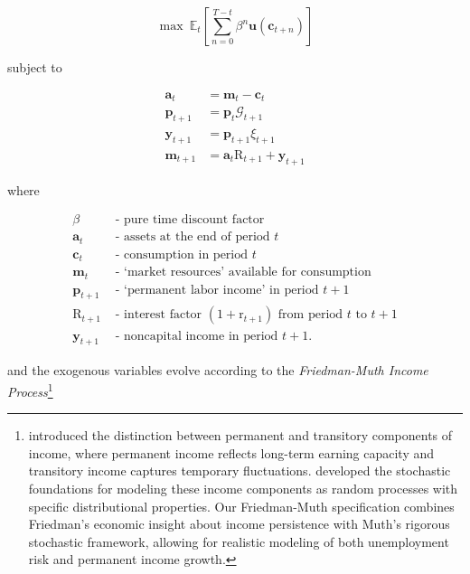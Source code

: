 \documentclass[twocolumn, switch]{article}
\newcommand{\uFunc}{\mathbf{u}}
\newcommand{\Ex}{\mathbf{\mathbb{E}}}
\newcommand{\DiscFac}{\beta}
\newcommand{\cLvl}{\mathbf{c}}
\newcommand{\Rfree}{\text{R}}
\newcommand{\PermGroShk}{\mathcal{G}}
\newcommand{\tranShk}{\xi}
\newcommand{\aLvl}{\mathbf{a}}
\newcommand{\mLvl}{\mathbf{m}}
\newcommand{\pLvl}{\mathbf{p}}
\newcommand{\yLvl}{\mathbf{y}}
\newcommand{\rfree}{\text{r}}
\begin{document}
\begin{equation}
\label{eq:MaxProb}
\max~\Ex_{t}\left[\sum_{n=0}^{T-t}\DiscFac^{n} \uFunc(\cLvl_{t+n})\right]
\end{equation}

subject to

\begin{equation}
\label{eq:DBCLevel}
\begin{aligned}
\aLvl_{t}  &= \mLvl_{t}-\cLvl_{t} \\
\pLvl_{t+1}  &= \pLvl_{t} \PermGroShk_{t+1}  \\
\yLvl_{t+1}  &= \pLvl_{t+1}\tranShk_{t+1} \\
\mLvl_{t+1}  &= \aLvl_{t}\Rfree_{t+1} + \yLvl_{t+1}
\end{aligned}
\end{equation}

where

\begin{equation}
\begin{aligned}
\DiscFac &\text{ - pure time discount factor} \\
\aLvl_{t} &\text{ - assets at the end of period } t \\
\cLvl_{t} &\text{ - consumption in period } t \\
\mLvl_{t} &\text{ - `market resources' available for consumption} \\
\pLvl_{t+1} &\text{ - `permanent labor income' in period } t+1 \\
\Rfree_{t+1} &\text{ - interest factor } (1+\rfree_{t+1}) \text{ from period } t \text{ to } t+1 \\
\yLvl_{t+1} &\text{ - noncapital income in period } t+1.
\end{aligned}
\end{equation}

and the exogenous variables evolve according to the \textit{Friedman-Muth Income Process}\footnote{\citet{Friedman1957} introduced the distinction between permanent and transitory components of income, where permanent income reflects long-term earning capacity and transitory income captures temporary fluctuations. \citet{Muth1960} developed the stochastic foundations for modeling these income components as random processes with specific distributional properties. Our Friedman-Muth specification combines Friedman's economic insight about income persistence with Muth's rigorous stochastic framework, allowing for realistic modeling of both unemployment risk and permanent income growth.}
\end{document}
